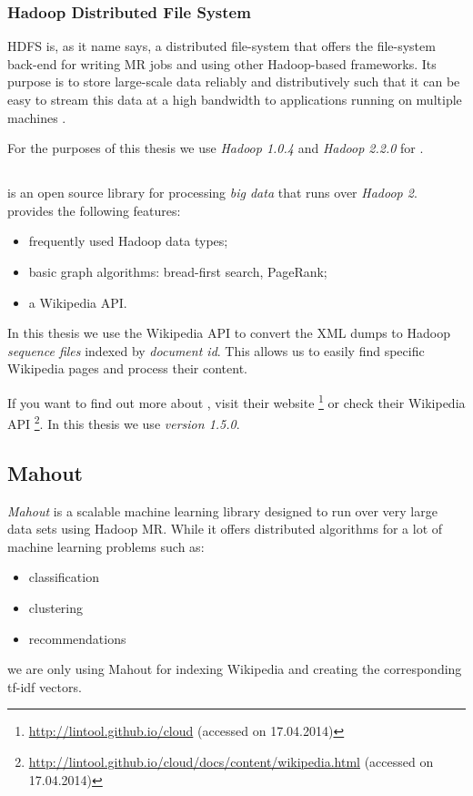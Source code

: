 \subsubsection{Hadoop Distributed File System}

\acf{HDFS} is, as it name says, a distributed file-system that offers the
file-system back-end for writing \acl{MR} jobs and using other Hadoop-based
frameworks. Its purpose is to store large-scale data reliably and
distributively such that it can be easy to stream this data at a high bandwidth
to applications running on multiple machines \cite{shvachko2010hadoop}.

For the purposes of this thesis we use \emph{Hadoop 1.0.4} and \emph{Hadoop
2.2.0} for \cloud.

\subsection{\cloud}

\emph{\cloud} is an open source library for processing \emph{big data} that
runs over \emph{Hadoop 2}. \cloud provides the following features:
\begin{itemize}
  \item frequently used Hadoop data types;
  \item basic graph algorithms: bread-first search, PageRank;
  \item a Wikipedia \ac{API}.
\end{itemize}
In this thesis we use the Wikipedia \ac{API} to convert the \ac{XML} dumps to
Hadoop \emph{sequence files} indexed by \emph{document id}. This allows us to
easily find specific Wikipedia pages and process their content.

If you want to find out more about \cloud, visit their website
\footnote{\url{http://lintool.github.io/cloud} (accessed on 17.04.2014)} or
check their Wikipedia \ac{API}
\footnote{\url{http://lintool.github.io/cloud/docs/content/wikipedia.html}
(accessed on 17.04.2014)}. In this thesis we use \emph{\cloud version 1.5.0}.

\subsection{Mahout}

\emph{Mahout} is a scalable machine learning library designed to run over very
large data sets using Hadoop \acl{MR}. While it offers distributed algorithms
for a lot of machine learning problems such as:
\begin{itemize}
  \item classification
  \item clustering
  \item recommendations
\end{itemize}
we are only using Mahout for indexing Wikipedia and creating the corresponding
tf-idf vectors.

